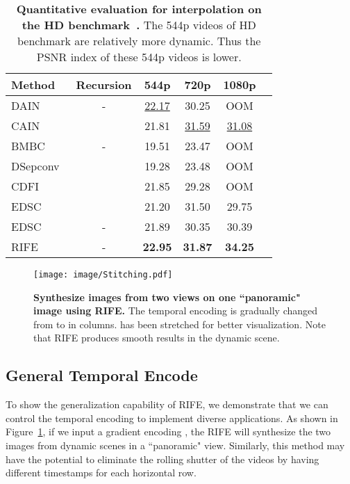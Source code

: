 \documentclass[final]{cvpr}
\def\red#1{\textcolor{MyRed}{#1}}
\def\blue#1{\textcolor{MyBlue}{#1}}
\def\first#1{\red{\textbf{#1}}}
\def\second#1{\blue{\underline{#1}}}
\begin{document}
\begin{table}[t]
	
	\caption{\textbf{Quantitative evaluation for  interpolation on the HD benchmark~\cite{bao2019memc}. } The 544p videos of HD benchmark are relatively more dynamic. Thus the PSNR index of these 544p videos is lower.}\label{tab:hd8}
	\centering
	\small
	\begin{tabular}{lccccc}
		\hline
		Method & Recursion & 544p & 720p & 1080p\\ \hline
		DAIN~\cite{bao2019depth} & -& \second{22.17} & 30.25 & OOM \\
		CAIN~\cite{choi2020channel} & \checkmark & 21.81 & \second{31.59} & \second{31.08}  \\
		BMBC~\cite{park2020bmbc} & - & 19.51 & 23.47 & OOM 
		\\ 
		DSepconv~\cite{cheng2020video} & \checkmark & 19.28 & 23.48 & OOM\\
		CDFI~\cite{ding2021cdfi} & \checkmark & 21.85 & 29.28 & OOM \\
		EDSC~\cite{cheng2020multiple} & \checkmark & 21.20 & 31.50 & 29.75\\
		EDSC~\cite{cheng2020multiple} & - & 21.89 & 30.35 & 30.39 \\
		\hline
		RIFE & - & \first{22.95} & \first{31.87} & \first{34.25} \\ \hline
	\end{tabular}
	\normalsize


\end{table}

\begin{figure}[t]
	\centering
	\texttt{[image: image/Stitching.pdf]}
	\caption{\textbf{Synthesize images from two views on one ``panoramic" image  using RIFE.} The temporal encoding  is gradually changed from  to  in columns.  has been stretched for better visualization. Note that RIFE produces smooth results in the dynamic scene.}\label{fig:Stitching}
\end{figure}

\subsection{General Temporal Encode}
To show the generalization capability of RIFE, we demonstrate that we can control the temporal encoding  to implement diverse applications. As shown in Figure~\ref{fig:Stitching}, if we input a gradient encoding , the RIFE will synthesize the two images from dynamic scenes in a ``panoramic" view. Similarly, this method may have the potential to eliminate the rolling shutter of the videos by having different timestamps for each horizontal row.
\end{document}
